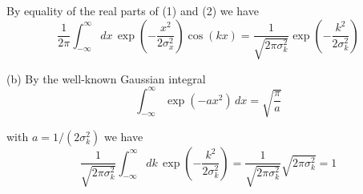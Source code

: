 By equality of the real parts of (1) and (2) we have
\begin{equation*}
\frac{1}{2\pi}\int_{-\infty}^\infty dx\,
\exp\left(-\frac{x^2}{2\sigma_x^2}\right)\cos(kx)
=\frac{1}{\sqrt{2\pi\sigma_k^2}}\exp\left(-\frac{k^2}{2\sigma_k^2}\right)
\end{equation*}

(b) By the well-known Gaussian integral
\begin{equation*}
\int_{-\infty}^\infty\exp(-ax^2)\,dx=\sqrt{\frac{\pi}{a}}
\end{equation*}

with $a=1/(2\sigma_k^2)$ we have
\begin{equation*}
\frac{1}{\sqrt{2\pi\sigma_k^2}}\int_{-\infty}^\infty dk\,\exp\left(-\frac{k^2}{2\sigma_k^2}\right)
=\frac{1}{\sqrt{2\pi\sigma_k^2}}\sqrt{2\pi\sigma_k^2}=1
\end{equation*}


